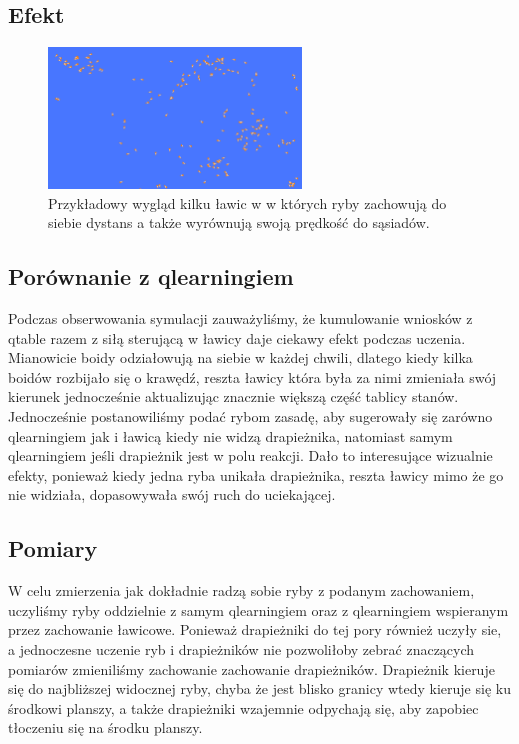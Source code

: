 \documentclass{article}
\begin{document}
\subsection{Efekt}
\begin{figure}[H]
    \centering
    \includegraphics[width=0.6\textwidth]{flocking_example.png}
    \caption{Przykładowy wygląd kilku ławic w w których ryby zachowują do siebie dystans a także wyrównują swoją prędkość do sąsiadów.}
\end{figure}
\subsection{Porównanie z qlearningiem}
Podczas obserwowania symulacji zauważyliśmy, że kumulowanie wniosków z qtable razem z siłą sterującą w ławicy daje ciekawy efekt podczas uczenia. Mianowicie boidy odziałowują na siebie w każdej chwili, dlatego kiedy kilka boidów rozbijało się o krawędź, reszta ławicy która była za nimi zmieniała swój kierunek jednocześnie aktualizując znacznie większą część tablicy stanów.\\
Jednocześnie postanowiliśmy podać rybom zasadę, aby sugerowały się zarówno qlearningiem jak i ławicą kiedy nie widzą drapieżnika, natomiast samym qlearningiem jeśli drapieżnik jest w polu reakcji. Dało to interesujące wizualnie efekty, ponieważ kiedy jedna ryba unikała drapieżnika, reszta ławicy mimo że go nie widziała, dopasowywała swój ruch do uciekającej. 
\subsection{Pomiary}
W celu zmierzenia jak dokładnie radzą sobie ryby z podanym zachowaniem, uczyliśmy ryby oddzielnie z samym qlearningiem oraz z qlearningiem wspieranym przez zachowanie ławicowe. Ponieważ drapieżniki do tej pory również uczyły sie, a jednoczesne uczenie ryb i drapieżników nie pozwoliłoby zebrać znaczących pomiarów zmieniliśmy zachowanie zachowanie drapieżników. Drapieżnik kieruje się do najbliższej widocznej ryby, chyba że jest blisko granicy wtedy kieruje się ku środkowi planszy, a także drapieżniki wzajemnie odpychają się, aby zapobiec tłoczeniu się na środku planszy.
\end{document}
